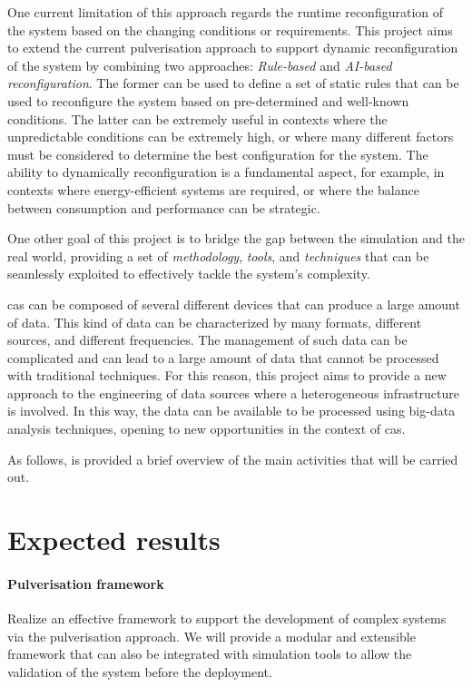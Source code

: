 \documentclass[12pt]{article}
\begin{document}
%
One current limitation of this approach regards the runtime reconfiguration of the system based on the changing conditions or requirements.
%
This project aims to extend the current pulverisation approach to support dynamic reconfiguration of the system
by combining two approaches: \emph{Rule-based} and \emph{AI-based reconfiguration}.
%
The former can be used to define a set of static rules that can be used to reconfigure the system based on pre-determined and well-known conditions.
%
The latter can be extremely useful in contexts where the unpredictable conditions can be extremely high,
or where many different factors must be considered to determine the best configuration for the system.
%
The ability to dynamically reconfiguration is a fundamental aspect,
for example,
in contexts where energy-efficient systems are required,
or where the balance between consumption and performance can be strategic.

One other goal of this project is to bridge the gap between the simulation and the real world,
providing a set of \emph{methodology}, \emph{tools}, and \emph{techniques}
that can be seamlessly exploited to effectively tackle the system's complexity.

\ac{cas} can be composed of several different devices that can produce a large amount of data.
%
This kind of data can be characterized by many formats, different sources, and different frequencies.
%
The management of such data can be complicated and can lead to a large amount of data that cannot be processed with traditional techniques.
%
For this reason,
this project aims to provide a new approach to the engineering of data sources where a heterogeneous infrastructure is involved.
%
In this way,
the data can be available to be processed using big-data analysis techniques,
opening to new opportunities in the context of \ac{cas}.

As follows, is provided a brief overview of the main activities that will be carried out.


\section{Expected results}\label{sec:expected-results}

\paragraph{Pulverisation framework}
Realize an effective framework to support the development of complex systems
via the pulverisation approach.
%
We will provide a modular and extensible framework that can also be integrated with simulation tools
to allow the validation of the system before the deployment.
\end{document}
